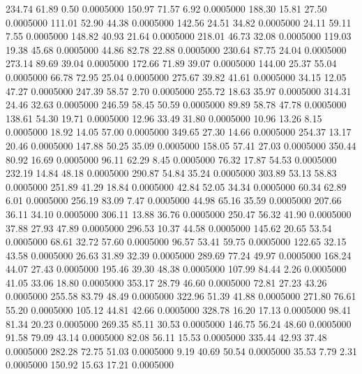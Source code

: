  234.74   61.89    0.50   0.0005000
 150.97   71.57    6.92   0.0005000
 188.30   15.81   27.50   0.0005000
 111.01   52.90   44.38   0.0005000
 142.56   24.51   34.82   0.0005000
  24.11   59.11    7.55   0.0005000
 148.82   40.93   21.64   0.0005000
 218.01   46.73   32.08   0.0005000
 119.03   19.38   45.68   0.0005000
  44.86   82.78   22.88   0.0005000
 230.64   87.75   24.04   0.0005000
 273.14   89.69   39.04   0.0005000
 172.66   71.89   39.07   0.0005000
 144.00   25.37   55.04   0.0005000
  66.78   72.95   25.04   0.0005000
 275.67   39.82   41.61   0.0005000
  34.15   12.05   47.27   0.0005000
 247.39   58.57    2.70   0.0005000
 255.72   18.63   35.97   0.0005000
 314.31   24.46   32.63   0.0005000
 246.59   58.45   50.59   0.0005000
  89.89   58.78   47.78   0.0005000
 138.61   54.30   19.71   0.0005000
  12.96   33.49   31.80   0.0005000
  10.96   13.26    8.15   0.0005000
  18.92   14.05   57.00   0.0005000
 349.65   27.30   14.66   0.0005000
 254.37   13.17   20.46   0.0005000
 147.88   50.25   35.09   0.0005000
 158.05   57.41   27.03   0.0005000
 350.44   80.92   16.69   0.0005000
  96.11   62.29    8.45   0.0005000
  76.32   17.87   54.53   0.0005000
 232.19   14.84   48.18   0.0005000
 290.87   54.84   35.24   0.0005000
 303.89   53.13   58.83   0.0005000
 251.89   41.29   18.84   0.0005000
  42.84   52.05   34.34   0.0005000
  60.34   62.89    6.01   0.0005000
 256.19   83.09    7.47   0.0005000
  44.98   65.16   35.59   0.0005000
 207.66   36.11   34.10   0.0005000
 306.11   13.88   36.76   0.0005000
 250.47   56.32   41.90   0.0005000
  37.88   27.93   47.89   0.0005000
 296.53   10.37   44.58   0.0005000
 145.62   20.65   53.54   0.0005000
  68.61   32.72   57.60   0.0005000
  96.57   53.41   59.75   0.0005000
 122.65   32.15   43.58   0.0005000
  26.63   31.89   32.39   0.0005000
 289.69   77.24   49.97   0.0005000
 168.24   44.07   27.43   0.0005000
 195.46   39.30   48.38   0.0005000
 107.99   84.44    2.26   0.0005000
  41.05   33.06   18.80   0.0005000
 353.17   28.79   46.60   0.0005000
  72.81   27.23   43.26   0.0005000
 255.58   83.79   48.49   0.0005000
 322.96   51.39   41.88   0.0005000
 271.80   76.61   55.20   0.0005000
 105.12   44.81   42.66   0.0005000
 328.78   16.20   17.13   0.0005000
  98.41   81.34   20.23   0.0005000
 269.35   85.11   30.53   0.0005000
 146.75   56.24   48.60   0.0005000
  91.58   79.09   43.14   0.0005000
  82.08   56.11   15.53   0.0005000
 335.44   42.93   37.48   0.0005000
 282.28   72.75   51.03   0.0005000
   9.19   40.69   50.54   0.0005000
  35.53    7.79    2.31   0.0005000
 150.92   15.63   17.21   0.0005000
